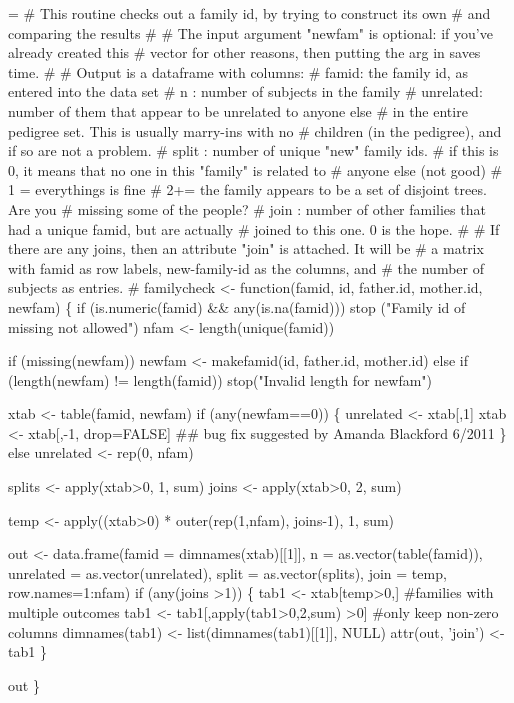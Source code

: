 \documentclass{article}
\begin{document}
\begin{nwchunk}
=
 # This routine checks out a family id, by trying to construct its own
 #  and comparing the results
 #
 # The input argument "newfam" is optional: if you've already created this
 #   vector for other reasons, then putting the arg in saves time.
 #
 # Output is a dataframe with columns:
 #   famid: the family id, as entered into the data set
 #   n    : number of subjects in the family
 #   unrelated: number of them that appear to be unrelated to anyone else 
 #          in the entire pedigree set.  This is usually marry-ins with no 
 #          children (in the pedigree), and if so are not a problem.
 #   split : number of unique "new" family ids.
 #            if this is 0, it means that no one in this "family" is related to
 #                   anyone else (not good)
 #            1 = everythings is fine
 #            2+= the family appears to be a set of disjoint trees.  Are you
 #                 missing some of the people?
 #   join : number of other families that had a unique famid, but are actually
 #            joined to this one.  0 is the hope.
 #
 #  If there are any joins, then an attribute "join" is attached.  It will be
 #   a matrix with famid as row labels, new-family-id as the columns, and
 #   the number of subjects as entries.  
 #
 familycheck <- function(famid, id, father.id, mother.id, newfam) \{
     if (is.numeric(famid) && any(is.na(famid)))
         stop ("Family id of missing not allowed")
     nfam <- length(unique(famid))
 
     if (missing(newfam)) newfam <- makefamid(id, father.id, mother.id)
     else if (length(newfam) != length(famid))
         stop("Invalid length for newfam")
 
     xtab <- table(famid, newfam)
     if (any(newfam==0)) \{
         unrelated <- xtab[,1]
         xtab <- xtab[,-1, drop=FALSE] 
         ## bug fix suggested by Amanda Blackford 6/2011
       \}
     else unrelated <-  rep(0, nfam)
 
     splits <- apply(xtab>0, 1, sum)
     joins  <- apply(xtab>0, 2, sum)
 
     temp <- apply((xtab>0) * outer(rep(1,nfam), joins-1), 1, sum)
 
     out <- data.frame(famid = dimnames(xtab)[[1]],
                       n = as.vector(table(famid)),
                       unrelated = as.vector(unrelated),
                       split = as.vector(splits),
                       join = temp,
                       row.names=1:nfam)
     if (any(joins >1)) \{
       tab1 <- xtab[temp>0,]  #families with multiple outcomes
       tab1 <- tab1[,apply(tab1>0,2,sum) >0] #only keep non-zero columns
       dimnames(tab1) <- list(dimnames(tab1)[[1]], NULL)
       attr(out, 'join') <- tab1
     \}
     
     out
   \}
 
 
\end{nwchunk}
\end{document}
